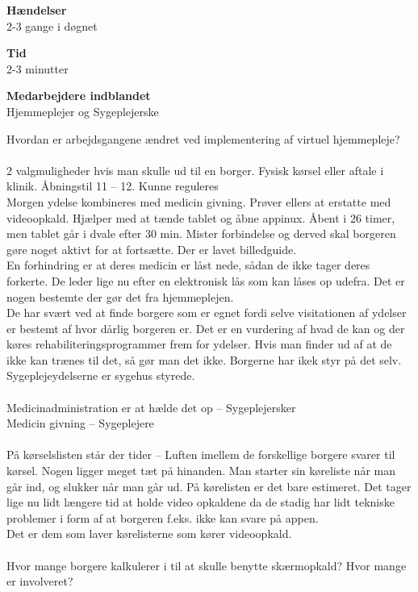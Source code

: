 \textbf{Hændelser}\\
2-3 gange i døgnet

\textbf{Tid}\\
2-3 minutter 

\textbf{Medarbejdere indblandet}\\
Hjemmeplejer og Sygeplejerske


Hvordan er arbejdsgangene ændret ved implementering af virtuel hjemmepleje?\\\\
2 valgmuligheder hvis man skulle ud til en borger. Fysisk kørsel eller aftale i klinik. Åbningstil 11 – 12. Kunne reguleres\\
Morgen ydelse kombineres med medicin givning. Prøver ellers at erstatte med videoopkald.  Hjælper med at tænde tablet og åbne appinux. Åbent i 26 timer, men tablet går i dvale efter 30 min. Mister forbindelse og derved skal borgeren gøre noget aktivt for at fortsætte. Der er lavet billedguide. \\
En forhindring er at deres medicin er låst nede, sådan de ikke tager deres forkerte. De leder lige nu efter en elektronisk lås som kan låses op udefra. Det er nogen bestemte der gør det fra hjemmeplejen. \\
De har svært ved at finde borgere som er egnet fordi selve visitationen af ydelser er bestemt af hvor dårlig borgeren er. Det er en vurdering af hvad de kan og der køres rehabiliteringsprogrammer frem for ydelser. Hvis man finder ud af at de ikke kan trænes til det, så gør man det ikke. Borgerne har ikek styr på det selv. Sygeplejeydelserne er sygehus styrede.\\\\ 
Medicinadministration er at hælde det op – Sygeplejersker \\
Medicin givning – Sygeplejere\\\\
På kørselslisten står der tider – Luften imellem de forskellige borgere svarer til kørsel. Nogen ligger meget tæt på hinanden. Man starter sin køreliste når man går ind, og slukker når man går ud. På kørelisten er det bare estimeret. Det tager lige nu lidt længere tid at holde video opkaldene da de stadig har lidt tekniske problemer i form af at borgeren f.eks. ikke kan svare på appen. \\
Det er dem som laver kørelisterne som kører videoopkald.\\\\ 
Hvor mange borgere kalkulerer i til at skulle benytte skærmopkald? Hvor mange er involveret? \\
